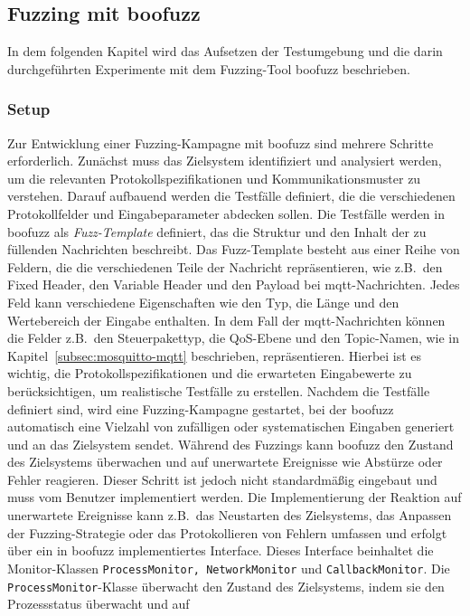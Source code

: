 
\subsection{Fuzzing mit boofuzz}\label{subsec:boofuzz}
In dem folgenden Kapitel wird das Aufsetzen der Testumgebung und die darin durchgeführten Experimente mit dem Fuzzing-Tool
boofuzz beschrieben.
\subsubsection{Setup}
Zur Entwicklung einer Fuzzing-Kampagne mit boofuzz sind mehrere Schritte erforderlich.
Zunächst muss das Zielsystem identifiziert und analysiert werden, um die relevanten Protokollspezifikationen und
Kommunikationsmuster zu verstehen.
Darauf aufbauend werden die Testfälle definiert, die die verschiedenen Protokollfelder und Eingabeparameter abdecken sollen.
Die Testfälle werden in boofuzz als \textit{Fuzz-Template} definiert, das die Struktur und den Inhalt der zu füllenden
Nachrichten beschreibt.
Das Fuzz-Template besteht aus einer Reihe von Feldern, die die verschiedenen Teile der Nachricht repräsentieren, wie z.B.\ den
Fixed Header, den Variable Header und den Payload bei \gls{mqtt}-Nachrichten.
Jedes Feld kann verschiedene Eigenschaften wie den Typ, die Länge und den Wertebereich der Eingabe enthalten.
In dem Fall der \gls{mqtt}-Nachrichten können die Felder z.B.\ den Steuerpakettyp, die QoS-Ebene und den Topic-Namen,
wie in Kapitel~\ref{subsec:mosquitto-mqtt} beschrieben, repräsentieren.
Hierbei ist es wichtig, die Protokollspezifikationen und die erwarteten Eingabewerte zu berücksichtigen, um realistische
Testfälle zu erstellen.
Nachdem die Testfälle definiert sind, wird eine Fuzzing-Kampagne gestartet, bei der boofuzz automatisch eine Vielzahl
von zufälligen oder systematischen Eingaben generiert und an das Zielsystem sendet.
Während des Fuzzings kann boofuzz den Zustand des Zielsystems überwachen und auf unerwartete Ereignisse wie Abstürze oder
Fehler reagieren.
Dieser Schritt ist jedoch nicht standardmäßig eingebaut und muss vom Benutzer implementiert werden.
Die Implementierung der Reaktion auf unerwartete Ereignisse kann z.B.\ das Neustarten des Zielsystems, das Anpassen der
Fuzzing-Strategie oder das Protokollieren von Fehlern umfassen und erfolgt über ein in boofuzz implementiertes Interface.
Dieses Interface beinhaltet die Monitor-Klassen \texttt{ProcessMonitor, NetworkMonitor} und \texttt{CallbackMonitor}.
Die \texttt{ProcessMonitor}-Klasse überwacht den Zustand des Zielsystems, indem sie den Prozessstatus überwacht und auf
